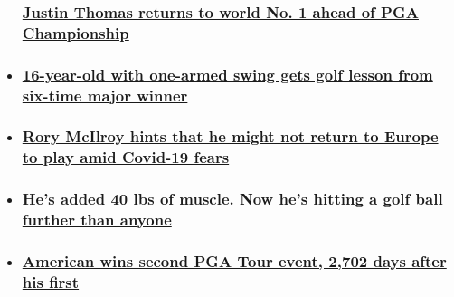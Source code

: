 \begin{itemize}
{  \subsubsection{\texorpdfstring{\href{/2020/08/03/golf/justin-thomas-golf-world-ranking-spt-intl/index.html}{Justin
  Thomas returns to world No. 1 ahead of PGA Championship
  }}{Justin Thomas returns to world No. 1 ahead of PGA Championship }}\label{justin-thomas-returns-to-world-no-1-ahead-of-pga-championship-}}
\item
  \hypertarget{16-year-old-with-one-armed-swing-gets-golf-lesson-from-six-time-major-winner-}{%
  \subsubsection{\texorpdfstring{\href{/2020/08/01/golf/kendall-kemm-one-arm-golf-swing-nick-faldo-phil-mickelson-spt-intl/index.html}{16-year-old
  with one-armed swing gets golf lesson from six-time major winner
  }}{16-year-old with one-armed swing gets golf lesson from six-time major winner }}\label{16-year-old-with-one-armed-swing-gets-golf-lesson-from-six-time-major-winner-}}
\item
  \hypertarget{rory-mcilroy-hints-that-he-might-not-return-to-europe-to-play-amid-covid-19-fears}{%
  \subsubsection{\texorpdfstring{\href{/2020/07/30/golf/rory-mcilroy-europe-us-open-spt-intl/index.html}{Rory
  McIlroy hints that he might not return to Europe to play amid Covid-19
  fears}}{Rory McIlroy hints that he might not return to Europe to play amid Covid-19 fears}}\label{rory-mcilroy-hints-that-he-might-not-return-to-europe-to-play-amid-covid-19-fears}}
\item
  \hypertarget{hes-added-40-lbs-of-muscle-now-hes-hitting-a-golf-ball-further-than-anyone}{%
  \subsubsection{\texorpdfstring{\href{/2020/07/27/golf/bryson-dechambeau-changing-golf-spt-intl/index.html}{He's
  added 40 lbs of muscle. Now he's hitting a golf ball further than
  anyone}}{He's added 40 lbs of muscle. Now he's hitting a golf ball further than anyone}}\label{hes-added-40-lbs-of-muscle-now-hes-hitting-a-golf-ball-further-than-anyone}}
\item
  \hypertarget{american-wins-second-pga-tour-event-2702-days-after-his-first}{%
  \subsubsection{\texorpdfstring{\href{/2020/07/27/golf/michael-thompson-pga-tour-american-spt-intl/index.html}{American
  wins second PGA Tour event, 2,702 days after his
  first}}{American wins second PGA Tour event, 2,702 days after his first}}\label{american-wins-second-pga-tour-event-2702-days-after-his-first}}
\end{itemize}

